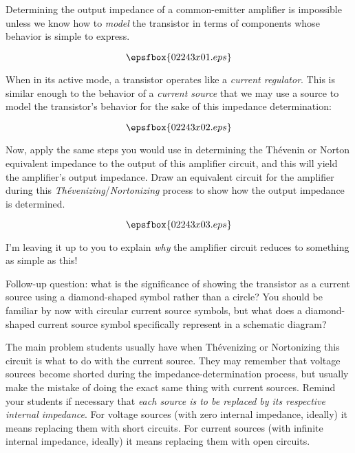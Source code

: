 

Determining the output impedance of a common-emitter amplifier is impossible unless we know how to {\it model} the transistor in terms of components whose behavior is simple to express.  

$$\epsfbox{02243x01.eps}$$

When in its active mode, a transistor operates like a {\it current regulator}.  This is similar enough to the behavior of a {\it current source} that we may use a source to model the transistor's behavior for the sake of this impedance determination:

$$\epsfbox{02243x02.eps}$$

Now, apply the same steps you would use in determining the Th\'evenin or Norton equivalent impedance to the output of this amplifier circuit, and this will yield the amplifier's output impedance.  Draw an equivalent circuit for the amplifier during this {\it Th\'evenizing}/{\it Nortonizing} process to show how the output impedance is determined.







$$\epsfbox{02243x03.eps}$$

I'm leaving it up to you to explain {\it why} the amplifier circuit reduces to something as simple as this!

\vskip 10pt

Follow-up question: what is the significance of showing the transistor as a current source using a diamond-shaped symbol rather than a circle?  You should be familiar by now with circular current source symbols, but what does a diamond-shaped current source symbol specifically represent in a schematic diagram?







The main problem students usually have when Th\'evenizing or Nortonizing this circuit is what to do with the current source.  They may remember that voltage sources become shorted during the impedance-determination process, but usually make the mistake of doing the exact same thing with current sources.  Remind your students if necessary that {\it each source is to be replaced by its respective internal impedance}.  For voltage sources (with zero internal impedance, ideally) it means replacing them with short circuits.  For current sources (with infinite internal impedance, ideally) it means replacing them with open circuits.




